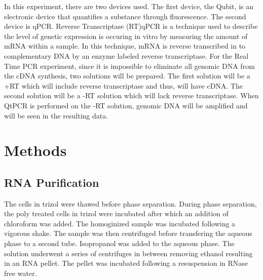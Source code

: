 \documentclass[journal, a4paper]{IEEEtran}
\begin{document}
  In this experiment, there are two devices used. The first device, the Qubit, is an electronic device that quantifies a substance through fluorescence.
  The second device is qPCR.
  Reverse Transcriptase (RT)qPCR is a technique used to describe the level of genetic expression is occuring in vitro
  by measuring the amount of mRNA within a sample. In this technique, mRNA is reverse transcribed in to complementary DNA by
  an enzyme labeled reverse transcriptase.
  For the Real Time PCR experiment, since it is impossible to eliminate all genomic DNA from the cDNA synthesis, two solutions will be prepared.
  The first solution will be a +RT which will include reverse transcriptase and thus, will have cDNA.
  The second solution will be a -RT solution which will lack reverse transcriptase.
  When QtPCR is performed on the -RT solution, genomic DNA will be amplified and will be seen in the resulting data.




\section{Methods}
    \subsection{RNA Purification}
      The cells in trizol were thawed before phase separation. During phase separation,
      the poly treated cells in trizol were incubated after which an addition of chloroform was added.
      The homoginized sample was incubated following a vigorous shake. The sample was then centrifuged before transfering the aqueous phase
      to a second tube. Isopropanol was added to the aqueous phase. The solution underwent a series of centrifuges in between removing ethanol
      resulting in an RNA pellet. The pellet was incubated following a resuspension in RNase free water.
\end{document}
